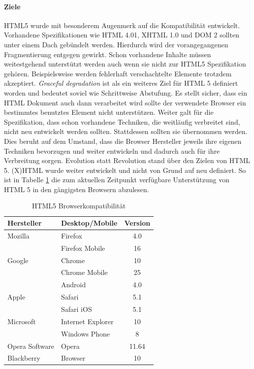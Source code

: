 \documentclass[12pt,a4paper,bibliography=totocnumbered,listof=totocnumbered]{scrartcl}
\begin{document}
\paragraph{Ziele} \ac{HTML}5 wurde mit besonderem Augenmerk auf die Kompatibilität entwickelt. Vorhandene Spezifikationen wie \ac{HTML} 4.01, \ac{XHTML} 1.0 und \ac{DOM} 2 sollten unter einem Dach gebündelt werden. Hierdurch wird der vorangegangenen Fragmentierung entgegen gewirkt. Schon vorhandene Inhalte müssen weitestgehend unterstützt werden auch wenn sie nicht zur \ac{HTML}5 Spezifikation gehören. Beispielsweise werden fehlerhaft verschachtelte Elemente trotzdem akzeptiert. \textit{Graceful degradation} ist als ein weiteres Ziel für HTML 5 definiert worden und bedeutet soviel wie \glqq Schrittweise Abstufung\grqq{}. Es stellt sicher, dass ein HTML Dokument auch dann verarbeitet wird sollte der verwendete Browser ein bestimmtes benutztes Element nicht unterstützen. Weiter galt für die Spezifikation, dass schon vorhandene Techniken, die weitläufig verbreitet sind, nicht neu entwickelt werden sollten. Stattdessen sollten sie übernommen werden. Dies beruht auf dem Umstand, dass die Browser Hersteller jeweils ihre eigenen Techniken bevorzugen und weiter entwickeln und dadurch auch für ihre Verbreitung sorgen. Evolution statt Revolution stand über den Zielen von HTML 5. (X)HTML wurde weiter entwickelt und nicht von Grund auf neu definiert. So ist in Tabelle \ref{tab:html5browserkomp} die zum aktuellen Zeitpunkt verfügbare Unterstützung von HTML 5 in den gängigsten Browsern abzulesen.

\vspace{1em}
\begin{table}[!h]
	\centering
	\begin{tabular}{|l|l|c|}
		\hline
		\textbf{Hersteller} & \textbf{Desktop/Mobile} & \textbf{Version}\\
		\hline
		Mozilla & Firefox & 4.0\\
		\hline
		 & Firefox Mobile & 16\\
		\hline
		Google & Chrome & 10\\
		\hline
		 & Chrome Mobile & 25\\
		\hline
		 & Android & 4.0\\
		\hline
		Apple & Safari & 5.1\\
		\hline
		 & Safari iOS & 5.1\\
		\hline
		Microsoft & Internet Explorer & 10\\
		\hline
		 & Windows Phone & 8\\
		\hline
		Opera Software & Opera & 11.64\\
		\hline
		Blackberry & Browser & 10\\
		\hline
	\end{tabular}
	\caption{HTML5 Browserkompatibilität}
	\label{tab:html5browserkomp}
\end{table}
\end{document}
